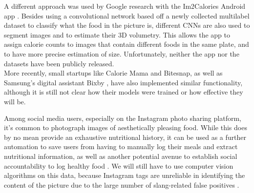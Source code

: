 A different approach was used by Google research with the Im2Calories Android app \cite{Myers2015}. Besides using a convolutional network based off a newly collected multilabel dataset to classify what the food in the picture is, different CNNs are also used to segment images and to estimate their 3D volumetry. This allows the app to assign calorie counts to images that contain different foods in the same plate, and to have more precise estimation of size. Unfortunately, neither the app nor the datasets have been publicly released.\\
More recently, small startups like Calorie Mama\cite{caloriemamaai} and Bitesnap\cite{bitesnap}, as well as Samsung's digital assistant Bixby \cite{bixbyarticle}, have also implemented similar functionality, although it is still not clear how their models were trained or how effective they will be. 

Among social media users, especially on the Instagram photo sharing platform, it's common to photograph images of aesthetically pleasing food. While this does by no mean provide an exhaustive nutritional history, it can be used as a further automation to save users from having to manually log their meals and extract nutritional information, as well as another potential avenue to establish social accountability to log healthy food \cite{Sharma:2015:MCN:2740908.2742754}. We will still have to use computer vision algorithms on this data, because Instagram tags are unreliable in identifying the content of the picture due to the large number of slang-related false positives \cite{hospedales2016}.

